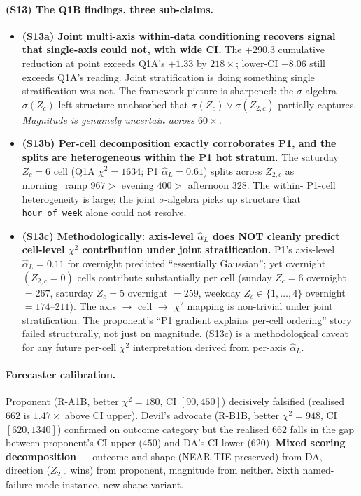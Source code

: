 \documentclass[11pt]{article}
\theoremstyle{definition}
\theoremstyle{plain}
\begin{document}
\paragraph{(S13) The Q1B findings, three sub-claims.}
\begin{itemize}[leftmargin=2em]
\item \textbf{(S13a) Joint multi-axis within-data conditioning
recovers signal that single-axis could not, with wide CI.} The
$+290.3$ cumulative reduction at point exceeds Q1A's $+1.33$ by
$218\times$; lower-CI $+8.06$ still exceeds Q1A's reading. Joint
stratification is doing something single stratification was not.
The framework picture is sharpened: the $\sigma$-algebra
$\sigma(Z_c)$ left structure unabsorbed that
$\sigma(Z_c) \vee \sigma(Z_{2,c})$ partially captures. \emph{Magnitude
is genuinely uncertain across $60\times$.}

\item \textbf{(S13b) Per-cell decomposition exactly corroborates
P1, and the splits are heterogeneous within the P1 hot stratum.}
The saturday $Z_c = 6$ cell (Q1A $\chi^2 = 1634$; P1
$\hat\alpha_L = 0.61$) splits across $Z_{2,c}$ as
morning\_ramp $967 >$ evening $400 >$ afternoon $328$. The within-
P1-cell heterogeneity is large; the joint $\sigma$-algebra picks
up structure that \texttt{hour\_of\_week} alone could not resolve.

\item \textbf{(S13c) Methodologically: axis-level $\hat\alpha_L$
does NOT cleanly predict cell-level $\chi^2$ contribution under
joint stratification.} P1's axis-level $\hat\alpha_L = 0.11$ for
overnight predicted ``essentially Gaussian''; yet overnight
$(Z_{2,c} = 0)$ cells contribute substantially per cell
(sunday $Z_c = 6$ overnight $= 267$, saturday $Z_c = 5$
overnight $= 259$, weekday $Z_c \in \{1, \ldots, 4\}$ overnight
$= 174$--$211$). The axis $\to$ cell $\to$ $\chi^2$ mapping is
non-trivial under joint stratification. The proponent's ``P1
gradient explains per-cell ordering'' story failed structurally,
not just on magnitude. (S13c) is a methodological caveat for any
future per-cell $\chi^2$ interpretation derived from per-axis
$\hat\alpha_L$.
\end{itemize}

\paragraph{Forecaster calibration.}
Proponent (R-A1B, $\mathrm{better}\_\chi^2 = 180$, CI $[90, 450]$)
decisively falsified (realised $662$ is $1.47\times$ above CI
upper). Devil's advocate (R-B1B, $\mathrm{better}\_\chi^2 = 948$,
CI $[620, 1340]$) confirmed on outcome category but the realised
$662$ falls in the gap between proponent's CI upper ($450$) and
DA's CI lower ($620$). \textbf{Mixed scoring decomposition} ---
outcome and shape (NEAR-TIE preserved) from DA, direction
($Z_{2,c}$ wins) from proponent, magnitude from neither. Sixth
named-failure-mode instance, new shape variant.
\end{document}
